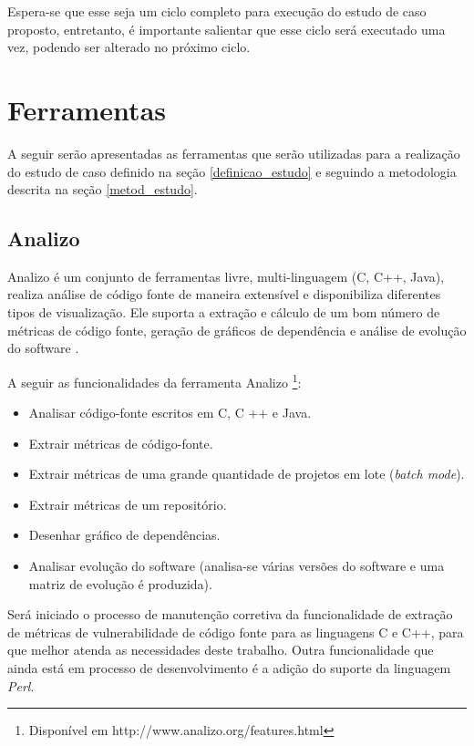 Espera-se que esse seja um ciclo completo para execução do estudo de caso proposto, entretanto, é importante salientar que esse
ciclo será executado uma vez, podendo ser alterado no próximo ciclo.

\section{Ferramentas} \label{tools}

A seguir serão apresentadas as ferramentas que serão utilizadas para a realização do estudo de caso definido na seção 
\ref{definicao_estudo} e seguindo a metodologia descrita na seção \ref{metod_estudo}.

\subsection{Analizo} \label{analizo}

Analizo é um conjunto de ferramentas livre, multi-linguagem (C, C++, Java), realiza análise de código fonte de maneira 
extensível e disponibiliza diferentes tipos de visualização. Ele suporta a extração e cálculo de um bom número de métricas de 
código fonte, geração de gráficos de dependência e análise de evolução do software \cite{analizo}.

A seguir as funcionalidades da ferramenta Analizo \footnote{Disponível em http://www.analizo.org/features.html}:

\begin{itemize}
  \item Analisar código-fonte escritos em C, C ++ e Java.
  \item Extrair métricas de código-fonte.
  \item Extrair métricas de uma grande quantidade de projetos em lote (\textit{batch mode}).
  \item Extrair métricas de um repositório.
  \item Desenhar gráfico de dependências.
  \item Analisar evolução do software (analisa-se várias versões do software e uma matriz de evolução é produzida).
\end{itemize}

Será iniciado o processo de manutenção corretiva da funcionalidade de extração de métricas de vulnerabilidade de código fonte 
para as linguagens C e C++, para que melhor atenda as necessidades deste trabalho. Outra funcionalidade que ainda está em 
processo de desenvolvimento é a adição do suporte da linguagem \textit{Perl}.

